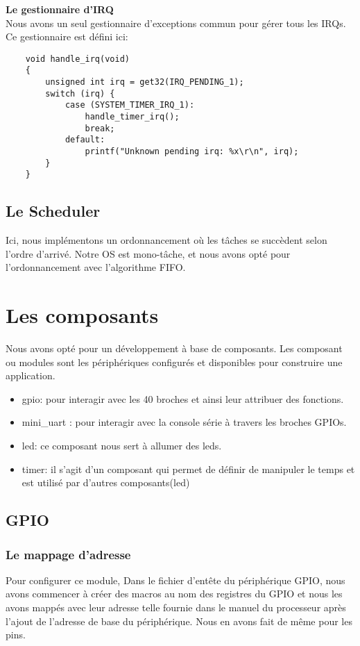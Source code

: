 \documentclass[12pt,a4paper,oneside]{book}
\begin{document}
\textbf{Le gestionnaire d'IRQ}\\
Nous avons un seul gestionnaire d'exceptions commun pour gérer tous les IRQs. Ce gestionnaire est défini ici: 
\begin{lstlisting}
	void handle_irq(void)
	{
    	unsigned int irq = get32(IRQ_PENDING_1);
    	switch (irq) {
        	case (SYSTEM_TIMER_IRQ_1):
            	handle_timer_irq();
            	break;
        	default:
            	printf("Unknown pending irq: %x\r\n", irq);
    	}
	}
\end{lstlisting}

\subsection{Le Scheduler}
Ici, nous implémentons un ordonnancement où les tâches se succèdent selon l'ordre d'arrivé. Notre OS est mono-tâche, et nous avons opté pour l'ordonnancement avec l'algorithme FIFO.\\

\section{Les composants}
Nous avons opté pour un développement à base de composants. Les composant ou modules sont les périphériques configurés et disponibles pour construire une application.\\
\begin{itemize}
	\item gpio: pour interagir avec les 40 broches et ainsi leur attribuer des fonctions.\\
	\item mini\_uart : pour interagir avec la console série à travers les broches GPIOs.\\
	\item led: ce composant nous sert à allumer des leds.\\
	\item timer: il s'agit d'un composant qui permet de définir de manipuler le temps et est utilisé par d'autres composants(led)
\end{itemize}

\subsection{GPIO}
\subsubsection{Le mappage d'adresse}
Pour configurer ce module, Dans le fichier d'entête du périphérique GPIO, nous avons commencer à créer des macros au nom des registres du GPIO et nous les avons mappés avec leur adresse telle fournie dans le manuel du processeur après l'ajout de l'adresse de base du périphérique. Nous en avons fait de même pour les pins.
\end{document}
